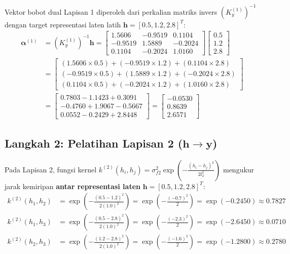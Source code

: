 \documentclass[11pt,a4paper]{article}
\begin{document}
Vektor bobot dual Lapisan 1 diperoleh dari perkalian matriks invers $(K_y^{(1)})^{-1}$ dengan target representasi laten latih $\mathbf{h} = [0.5, 1.2, 2.8]^T$:
\begin{align}
\boldsymbol{\alpha}^{(1)} &= (K_y^{(1)})^{-1} \mathbf{h} = \begin{bmatrix} 1.5606 & -0.9519 & 0.1104 \\ -0.9519 & 1.5889 & -0.2024 \\ 0.1104 & -0.2024 & 1.0160 \end{bmatrix} \begin{bmatrix} 0.5 \\ 1.2 \\ 2.8 \end{bmatrix} \nonumber \\
&= \begin{bmatrix} (1.5606 \times 0.5) + (-0.9519 \times 1.2) + (0.1104 \times 2.8) \\ (-0.9519 \times 0.5) + (1.5889 \times 1.2) + (-0.2024 \times 2.8) \\ (0.1104 \times 0.5) + (-0.2024 \times 1.2) + (1.0160 \times 2.8) \end{bmatrix} \nonumber \\
&= \begin{bmatrix} 0.7803 - 1.1423 + 0.3091 \\ -0.4760 + 1.9067 - 0.5667 \\ 0.0552 - 0.2429 + 2.8448 \end{bmatrix} = \begin{bmatrix} \mathbf{-0.0530} \\ \mathbf{0.8639} \\ \mathbf{2.6571} \end{bmatrix}
\end{align}

\subsection{Langkah 2: Pelatihan Lapisan 2 (\texorpdfstring{$\mathbf{h} \to \mathbf{y}$}{h -> y})}
Pada Lapisan 2, fungsi kernel $k^{(2)}(h_i, h_j) = \sigma_{f2}^2 \exp\left(-\frac{(h_i - h_j)^2}{2l_2^2}\right)$ mengukur jarak kemiripan \textbf{antar representasi laten} $\mathbf{h} = [0.5, 1.2, 2.8]^T$:
\begin{align*}
k^{(2)}(h_1, h_2) &= \exp\left(-\frac{(0.5 - 1.2)^2}{2(1.0)^2}\right) = \exp\left(-\frac{(-0.7)^2}{2}\right) = \exp(-0.2450) \approx 0.7827 \\
k^{(2)}(h_1, h_3) &= \exp\left(-\frac{(0.5 - 2.8)^2}{2(1.0)^2}\right) = \exp\left(-\frac{(-2.3)^2}{2}\right) = \exp(-2.6450) \approx 0.0710 \\
k^{(2)}(h_2, h_3) &= \exp\left(-\frac{(1.2 - 2.8)^2}{2(1.0)^2}\right) = \exp\left(-\frac{(-1.6)^2}{2}\right) = \exp(-1.2800) \approx 0.2780
\end{align*}
\end{document}
